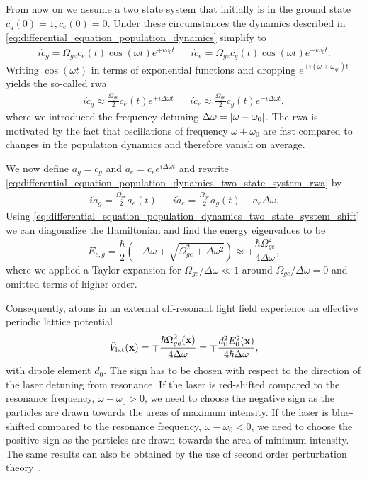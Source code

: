From now on we assume a two state system that initially is in the ground
state $c_g(0)=1,c_e(0)=0$. Under these circumstances the dynamics described in
\cref{eq:differential_equation_population_dynamics} simplify to
\begin{align}
  i\dot{c}_g=\Omega_{ge}c_e(t)\cos(\omega t)e^{+i\omega_0 t} &&
  i\dot{c}_e=\Omega_{ge}c_g(t)\cos(\omega t)e^{-i\omega_0 t}
  \label{eq:differential_equation_population_dynamics_two_state_system}.
\end{align}
Writing $\cos(\omega t)$ in terms of exponential functions and dropping
$e^{\pm i(\omega+\omega_{ge})t}$ yields the so-called \gls{rwa}
\begin{align}
  i\dot{c}_g\approx\frac{\Omega_{ge}}{2}c_e(t)e^{+i\Delta\omega t} &&
  i\dot{c}_e\approx\frac{\Omega_{ge}}{2}c_g(t)e^{-i\Delta\omega t}
  \label{eq:differential_equation_population_dynamics_two_state_system_rwa},
\end{align}
where we introduced the frequency detuning
$\Delta\omega=\abs{\omega-\omega_0}$. The \gls{rwa} is motivated by the fact
that oscillations of frequency $\omega+\omega_0$ are fast compared to changes
in the population dynamics and therefore vanish on average.

We now define $a_g=c_g$ and $a_e=c_e e^{i\Delta\omega t}$ and rewrite
\cref{eq:differential_equation_population_dynamics_two_state_system_rwa} by
\begin{align}
  i\dot{a}_g=\frac{\Omega_{ge}}{2}a_e(t) &&
  i\dot{a}_e=\frac{\Omega_{ge}}{2}a_g(t)-a_e\Delta\omega
  \label{eq:differential_equation_population_dynamics_two_state_system_shift}.
\end{align}
Using
\cref{eq:differential_equation_population_dynamics_two_state_system_shift} we
can diagonalize the Hamiltonian and find the energy eigenvalues to be
\begin{equation}
  E_{e,g}
  =\frac{\hbar}{2}\left(-\Delta\omega\mp\sqrt{\Omega_{ge}^2+\Delta\omega^2}\right)
  \approx
  \mp\frac{\hbar\Omega_{ge}^2}{4\Delta\omega}
  \label{eq:eigenvalues_energy_light_shift},
\end{equation}
where we applied a Taylor expansion for $\Omega_{ge}/\Delta\omega\ll1$ around
$\Omega_{ge}/\Delta\omega=0$ and omitted terms of higher order.

Consequently, atoms in an external off-resonant light field experience an
effective periodic lattice potential
\begin{equation}
  \hat{V}_\text{lat}(\vb{x})
  =
  \mp\frac{\hbar\Omega_{ge}^2(\vb{x})}{4\Delta\omega}
  =
  \mp\frac{d_0^2E_0^2(\vb{x})}{4\hbar\Delta\omega}
  \label{eq:potential_lattice},
\end{equation}
with dipole element $d_0$. The sign has to be chosen with respect to the
direction of the laser detuning from resonance. If the laser is red-shifted
compared to the resonance frequency, $\omega-\omega_0>0$, we need to choose
the negative sign as the particles are drawn towards the areas of maximum
intensity. If the laser is blue-shifted compared to the resonance frequency,
$\omega-\omega_0<0$, we need to choose the positive sign as the particles are
drawn towards the area of minimum intensity. The same results can also be
obtained by the use of second order perturbation theory~\cite{Grimm2008}.

